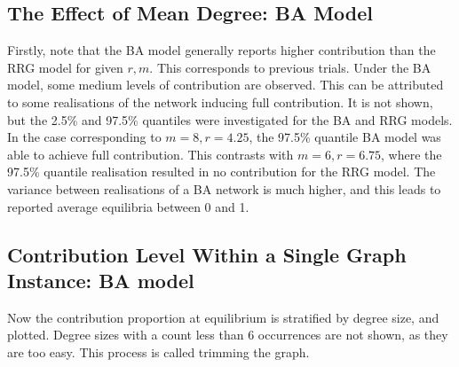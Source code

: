 \newpage
\subsection{The Effect of Mean Degree: BA Model}
\FloatBarrier
{}
\FloatBarrier
{}
\FloatBarrier

\FloatBarrier

Firstly, note that the BA model generally reports higher contribution than the RRG model for given $r,m$. This corresponds to previous trials. Under the BA model, some medium levels of contribution are observed. This can be attributed to some realisations of the network inducing full contribution. It is not shown, but the 2.5\% and 97.5\% quantiles were investigated for the BA and RRG models. In the case corresponding to $m=8, r = 4.25$, the 97.5\% quantile BA model was able to achieve full contribution. This contrasts with $m=6, r = 6.75$, where the 97.5\% quantile realisation resulted in no contribution for the RRG model. The variance between realisations of a BA network is much higher, and this leads to reported average equilibria between 0 and 1. 

\subsection{Contribution Level Within a Single Graph Instance: BA model } 
Now the contribution proportion at equilibrium is stratified by degree size, and plotted. Degree sizes with a count less than 6 occurrences are not shown, as they are too easy. This process is called trimming the graph. \\

